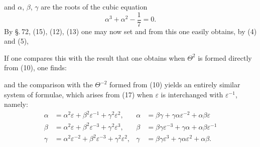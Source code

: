 and $\alpha$, $\beta$, $\gamma$ are the roots of the cubic equation
\[ \alpha^3 + \alpha^2 - \frac{1}{7} = 0. \]
By \S.\,72, (15), (12), (13) one may now set
and from this one easily obtains, by (4) and (5),

If one compares this with the result that one obtains when $\Theta^2$ is formed directly from (10), one finds:

and the comparison with the $\Theta^{-2}$ formed from (10) yields an entirely similar system of formulae, which arises from (17) when $\varepsilon$ is interchanged with $\varepsilon^{-1}$, namely:
\[ \begin{aligned}
\alpha &= \alpha^2\varepsilon + \beta^2\varepsilon^{-1} + \gamma^2\varepsilon^2, & \alpha &= \beta\gamma + \gamma\alpha\varepsilon^{-2} + \alpha\beta\varepsilon \\
\beta &= \alpha^2\varepsilon + \beta^2\varepsilon^{-3} + \gamma^2\varepsilon^3, & \beta &= \beta\gamma\varepsilon^{-3} + \gamma\alpha + \alpha\beta\varepsilon^{-1} \\
\gamma &= \alpha^2\varepsilon^{-2} + \beta^2\varepsilon^{-3} + \gamma^2\varepsilon^2, & \gamma &= \beta\gamma\varepsilon^3 + \gamma\alpha\varepsilon^2 + \alpha\beta.
\end{aligned} \]

